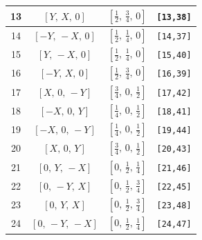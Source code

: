 \documentclass[fleqn,8pt]{jsarticle}
\begin{document}
\begin{longtable}{cccc}
13 & $\left[ Y,\, X,\, 0 \right]$ & $\left[ \frac{1}{2},\, \frac{3}{4},\, 0 \right]$ & {\tt [13,38]} \\ \hline
14 & $\left[ - Y,\, - X,\, 0 \right]$ & $\left[ \frac{1}{2},\, \frac{1}{4},\, 0 \right]$ & {\tt [14,37]} \\ \hline
15 & $\left[ Y,\, - X,\, 0 \right]$ & $\left[ \frac{1}{2},\, \frac{1}{4},\, 0 \right]$ & {\tt [15,40]} \\ \hline
16 & $\left[ - Y,\, X,\, 0 \right]$ & $\left[ \frac{1}{2},\, \frac{3}{4},\, 0 \right]$ & {\tt [16,39]} \\ \hline
17 & $\left[ X,\, 0,\, - Y \right]$ & $\left[ \frac{3}{4},\, 0,\, \frac{1}{2} \right]$ & {\tt [17,42]} \\ \hline
18 & $\left[ - X,\, 0,\, Y \right]$ & $\left[ \frac{1}{4},\, 0,\, \frac{1}{2} \right]$ & {\tt [18,41]} \\ \hline
19 & $\left[ - X,\, 0,\, - Y \right]$ & $\left[ \frac{1}{4},\, 0,\, \frac{1}{2} \right]$ & {\tt [19,44]} \\ \hline
20 & $\left[ X,\, 0,\, Y \right]$ & $\left[ \frac{3}{4},\, 0,\, \frac{1}{2} \right]$ & {\tt [20,43]} \\ \hline
21 & $\left[ 0,\, Y,\, - X \right]$ & $\left[ 0,\, \frac{1}{2},\, \frac{1}{4} \right]$ & {\tt [21,46]} \\ \hline
22 & $\left[ 0,\, - Y,\, X \right]$ & $\left[ 0,\, \frac{1}{2},\, \frac{3}{4} \right]$ & {\tt [22,45]} \\ \hline
23 & $\left[ 0,\, Y,\, X \right]$ & $\left[ 0,\, \frac{1}{2},\, \frac{3}{4} \right]$ & {\tt [23,48]} \\ \hline
24 & $\left[ 0,\, - Y,\, - X \right]$ & $\left[ 0,\, \frac{1}{2},\, \frac{1}{4} \right]$ & {\tt [24,47]} \\
\end{longtable}
\renewcommand{\arraystretch}{1.2}
\end{document}
